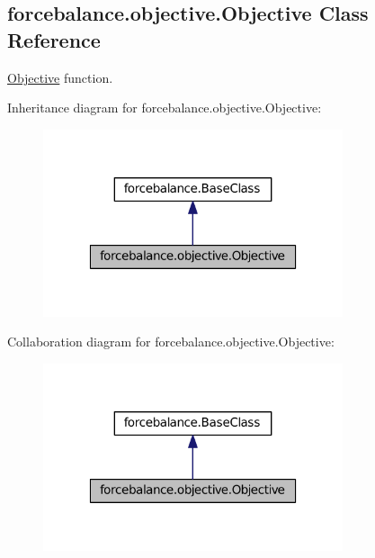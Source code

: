 \hypertarget{classforcebalance_1_1objective_1_1Objective}{\subsection{forcebalance.\-objective.\-Objective \-Class \-Reference}
\label{classforcebalance_1_1objective_1_1Objective}
}


\hyperlink{classforcebalance_1_1objective_1_1Objective}{\-Objective} function.  




\-Inheritance diagram for forcebalance.\-objective.\-Objective\-:\nopagebreak
\begin{figure}[H]
\begin{center}
\leavevmode
\includegraphics[width=250pt]{classforcebalance_1_1objective_1_1Objective__inherit__graph}
\end{center}
\end{figure}


\-Collaboration diagram for forcebalance.\-objective.\-Objective\-:\nopagebreak
\begin{figure}[H]
\begin{center}
\leavevmode
\includegraphics[width=250pt]{classforcebalance_1_1objective_1_1Objective__coll__graph}
\end{center}
\end{figure}
